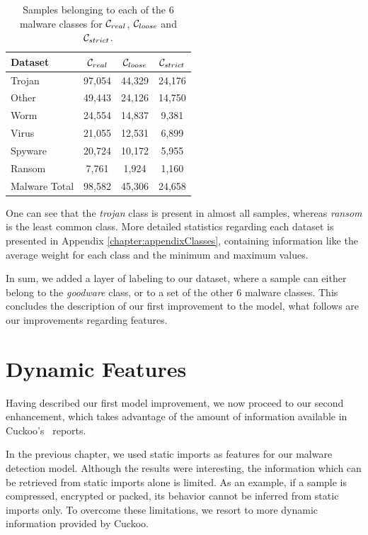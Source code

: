 \begin{table}[!htb]
	\renewcommand{\arraystretch}{1.2} %
	\centering
	\begin{tabular}{lccc}
		\toprule
		Dataset			& $\mathcal{C}_{real}$ & $\mathcal{C}_{loose}$ & $\mathcal{C}_{strict}$	\\
		\midrule
		Trojan			& 97,054 & 44,329 & 24,176\\
		Other			& 49,443 & 24,126 & 14,750\\
		Worm			& 24,554 & 14,837 & 9,381\\
		Virus			& 21,055 & 12,531 & 6,899\\
		Spyware			& 20,724 & 10,172 & 5,955\\
		Ransom			& 7,761 & 1,924 & 1,160\\
		\midrule
		\midrule
		Malware Total	& 98,582 & 45,306 & 24,658\\
		\bottomrule
	\end{tabular}
	\caption{Samples belonging to each of the 6 malware classes for $\mathcal{C}_{real}$, $\mathcal{C}_{loose}$ and $\mathcal{C}_{strict}$.}
	\label{tab:dataset_sizes_new}
\end{table}

One can see that the \textit{trojan} class is present in almost all samples, whereas \textit{ransom} is the least common class.
More detailed statistics regarding each dataset is presented in Appendix \ref{chapter:appendixClasses}, containing information like the average weight for each class and the minimum and maximum values.

\medskip

In sum, we added a layer of labeling to our dataset, where a sample can either belong to the \textit{goodware} class, or to a set of the other 6 malware classes.
This concludes the description of our first improvement to the model, what follows are our improvements regarding features.

\section{Dynamic Features}
\label{section:improvements_dynamic_features}

Having described our first model improvement, we now proceed to our second enhancement, which takes advantage of the amount of information available in Cuckoo's~\cite{tool:cuckoo} reports.

In the previous chapter, we used static imports as features for our malware detection model.
Although the results were interesting, the information which can be retrieved from static imports alone is limited.
As an example, if a sample is compressed, encrypted or packed, its behavior cannot be inferred from static imports only.
To overcome these limitations, we resort to more dynamic information provided by Cuckoo.

